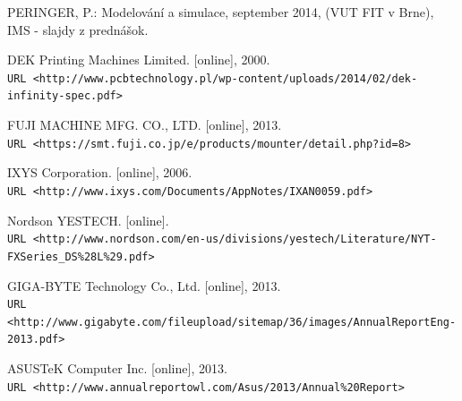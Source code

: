 \documentclass[12pt,a4paper,titlepage,final]{article}
\begin{document}
\begin{thebibliography}{9}

PERINGER, P.: Modelování a simulace, september 2014, (VUT FIT v Brne), IMS - slajdy z
prednášok.

DEK Printing Machines Limited. [online], 2000.
\\\texttt{URL <http://www.pcbtechnology.pl/wp-content/uploads/2014/02/dek-infinity-spec.pdf>}

FUJI MACHINE MFG. CO., LTD. [online], 2013.
\\\texttt{URL <https://smt.fuji.co.jp/e/products/mounter/detail.php?id=8>}

IXYS Corporation. [online], 2006.
\\\texttt{URL <http://www.ixys.com/Documents/AppNotes/IXAN0059.pdf>}

Nordson YESTECH. [online].
\\\texttt{URL <http://www.nordson.com/en-us/divisions/yestech/Literature/NYT-FXSeries\_DS\%28L\%29.pdf>}

GIGA-BYTE Technology Co., Ltd. [online], 2013.
\\\texttt{URL <http://www.gigabyte.com/fileupload/sitemap/36/images/AnnualReportEng-2013.pdf>}

ASUSTeK Computer Inc. [online], 2013.
\\\texttt{URL <http://www.annualreportowl.com/Asus/2013/Annual\%20Report>}

\end{thebibliography}
\end{document}
